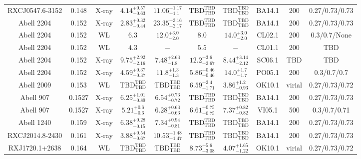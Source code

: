 \begin{table}
\begin{tabular}{cccccccccc}
RXCJ0547.6-3152 & 0.148 & X-ray & ${4.14}^{+0.57}_{-0.63}$ & ${11.06}^{+1.17}_{-1.1}$ & ${\mathrm{TBD}}^{\mathrm{TBD}}_{\mathrm{TBD}}$ & ${\mathrm{TBD}}^{\mathrm{TBD}}_{\mathrm{TBD}}$ & BA14.1 & 200 & 0.27/0.73/0.73 \\
Abell 2204 & 0.152 & X-ray & ${2.83}^{+0.32}_{-0.44}$ & ${23.35}^{+3.16}_{-2.17}$ & ${\mathrm{TBD}}^{\mathrm{TBD}}_{\mathrm{TBD}}$ & ${\mathrm{TBD}}^{\mathrm{TBD}}_{\mathrm{TBD}}$ & BA14.1 & 200 & 0.27/0.73/0.73 \\
Abell 2204 & 0.152 & WL & ${6.3}^{}_{}$ & ${12.0}^{+3.0}_{-2.0}$ & ${8.0}^{}_{}$ & ${14.0}^{+3.0}_{-2.0}$ & CL02.1 & 200 & 0.3/0.7/None \\
Abell 2204 & 0.152 & WL & ${4.3}^{}_{}$ & ${-}^{}_{}$ & ${5.5}^{}_{}$ & ${-}^{}_{}$ & CL01.1 & 200 & TBD \\
Abell 2204 & 0.152 & X-ray & ${9.75}^{+2.92}_{-2.16}$ & ${7.48}^{+2.63}_{-1.8}$ & ${12.2}^{+3.6}_{-2.67}$ & ${8.44}^{+3.14}_{-2.12}$ & SC06.1 & TBD & TBD \\
Abell 2204 & 0.152 & X-ray & ${4.59}^{+0.37}_{-0.37}$ & ${11.8}^{+1.3}_{-1.3}$ & ${5.86}^{+0.46}_{-0.46}$ & ${14.0}^{+1.7}_{-1.7}$ & PO05.1 & 200 & 0.3/0.7/0.7 \\
Abell 2009 & 0.153 & WL & ${\mathrm{TBD}}^{\mathrm{TBD}}_{\mathrm{TBD}}$ & ${\mathrm{TBD}}^{\mathrm{TBD}}_{\mathrm{TBD}}$ & ${6.59}^{+2.4}_{-1.71}$ & ${3.86}^{+1.2}_{-0.93}$ & OK10.1 & virial & 0.27/0.73/0.72 \\
Abell 907 & 0.1527 & X-ray & ${6.25}^{+1.01}_{-0.89}$ & ${6.54}^{+0.73}_{-0.72}$ & ${\mathrm{TBD}}^{\mathrm{TBD}}_{\mathrm{TBD}}$ & ${\mathrm{TBD}}^{\mathrm{TBD}}_{\mathrm{TBD}}$ & BA14.1 & 200 & 0.27/0.73/0.73 \\
Abell 907 & 0.1527 & X-ray & ${5.21}^{+0.6}_{-0.6}$ & ${6.28}^{+0.63}_{-0.63}$ & ${6.61}^{+0.75}_{-0.75}$ & ${7.37}^{+0.82}_{-0.82}$ & VI05.1 & 500 & 0.3/0.7/0.71 \\
Abell 1240 & 0.159 & X-ray & ${6.38}^{+0.28}_{-0.15}$ & ${7.34}^{+0.94}_{-0.81}$ & ${\mathrm{TBD}}^{\mathrm{TBD}}_{\mathrm{TBD}}$ & ${\mathrm{TBD}}^{\mathrm{TBD}}_{\mathrm{TBD}}$ & BA14.1 & 200 & 0.27/0.73/0.73 \\
RXCJ2014.8-2430 & 0.161 & X-ray & ${3.88}^{+0.54}_{-0.67}$ & ${10.53}^{+1.48}_{-1.47}$ & ${\mathrm{TBD}}^{\mathrm{TBD}}_{\mathrm{TBD}}$ & ${\mathrm{TBD}}^{\mathrm{TBD}}_{\mathrm{TBD}}$ & BA14.1 & 200 & 0.27/0.73/0.73 \\
RXJ1720.1+2638 & 0.164 & WL & ${\mathrm{TBD}}^{\mathrm{TBD}}_{\mathrm{TBD}}$ & ${\mathrm{TBD}}^{\mathrm{TBD}}_{\mathrm{TBD}}$ & ${8.73}^{+5.6}_{-3.08}$ & ${4.07}^{+1.65}_{-1.22}$ & OK10.1 & virial & 0.27/0.73/0.72 \\

\end{tabular}
\end{table}
